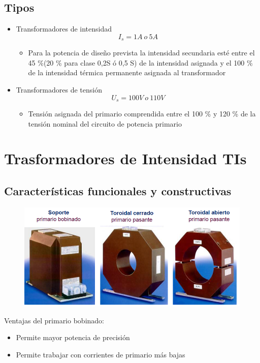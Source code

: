 \subsection{Tipos}
\begin{itemize}
	\item Transformadores de intensidad
	\begin{equation}
		I_s=1A \ o \ 5A
	\end{equation}
	\begin{itemize}
		\item Para la potencia de diseño prevista la intensidad secundaria esté entre el 45 \%(20 \% para clase 0,2S ó 0,5 S) de la intensidad asignada y el 100 \% de la intensidad térmica permanente asignada al transformador
	\end{itemize}
	\item Transformadores de tensión
	\begin{equation}
		U_s=100V \ o \ 110V
	\end{equation}
	\begin{itemize}
		\item Tensión asignada del primario comprendida entre el 100 \% y 120 \% de la tensión nominal del circuito de potencia primario
	\end{itemize}
\end{itemize}

\section{Trasformadores de Intensidad TIs}
\subsection{Características funcionales y constructivas}
\begin{figure}[H]
	\centering
	\includegraphics[width=0.7\linewidth]{Images/47}
	\label{fig:47}
\end{figure}

Ventajas del primario bobinado:
\begin{itemize}
	\item Permite mayor potencia de precisión
	\item Permite trabajar con corrientes de primario más bajas
\end{itemize}
